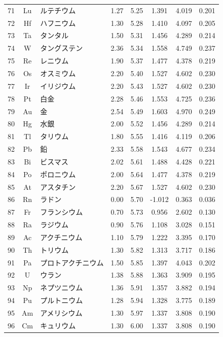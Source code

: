 \documentclass[11pt,a4paper]{article}
\begin{document}
\begin{longtable}{|c|c|p{2.5cm}|c|c|c|c|c|}
			71 & Lu & ルテチウム & 1.27 & 5.25 & 1.391 & 4.019 & 0.201 \\
			72 & Hf & ハフニウム & 1.30 & 5.28 & 1.410 & 4.097 & 0.205 \\
			73 & Ta & タンタル & 1.50 & 5.31 & 1.456 & 4.289 & 0.214 \\
			74 & W & タングステン & 2.36 & 5.34 & 1.558 & 4.749 & 0.237 \\
			75 & Re & レニウム & 1.90 & 5.37 & 1.477 & 4.378 & 0.219 \\
			76 & Os & オスミウム & 2.20 & 5.40 & 1.527 & 4.602 & 0.230 \\
			77 & Ir & イリジウム & 2.20 & 5.43 & 1.527 & 4.602 & 0.230 \\
			78 & Pt & 白金 & 2.28 & 5.46 & 1.553 & 4.725 & 0.236 \\
			79 & Au & 金 & 2.54 & 5.49 & 1.603 & 4.970 & 0.249 \\
			80 & Hg & 水銀 & 2.00 & 5.52 & 1.456 & 4.289 & 0.214 \\
			81 & Tl & タリウム & 1.80 & 5.55 & 1.416 & 4.119 & 0.206 \\
			82 & Pb & 鉛 & 2.33 & 5.58 & 1.543 & 4.677 & 0.234 \\
			83 & Bi & ビスマス & 2.02 & 5.61 & 1.488 & 4.428 & 0.221 \\
			84 & Po & ポロニウム & 2.00 & 5.64 & 1.477 & 4.378 & 0.219 \\
			85 & At & アスタチン & 2.20 & 5.67 & 1.527 & 4.602 & 0.230 \\
			86 & Rn & ラドン & 0.00 & 5.70 & -1.012 & 0.363 & 0.036 \\
			87 & Fr & フランシウム & 0.70 & 5.73 & 0.956 & 2.602 & 0.130 \\
			88 & Ra & ラジウム & 0.90 & 5.76 & 1.108 & 3.028 & 0.151 \\
			89 & Ac & アクチニウム & 1.10 & 5.79 & 1.222 & 3.395 & 0.170 \\
			90 & Th & トリウム & 1.30 & 5.82 & 1.313 & 3.717 & 0.186 \\
			91 & Pa & プロトアクチニウム & 1.50 & 5.85 & 1.397 & 4.043 & 0.202 \\
			92 & U & ウラン & 1.38 & 5.88 & 1.363 & 3.909 & 0.195 \\
			93 & Np & ネプツニウム & 1.36 & 5.91 & 1.357 & 3.882 & 0.194 \\
			94 & Pu & プルトニウム & 1.28 & 5.94 & 1.328 & 3.775 & 0.189 \\
			95 & Am & アメリシウム & 1.30 & 5.97 & 1.337 & 3.808 & 0.190 \\
			96 & Cm & キュリウム & 1.30 & 6.00 & 1.337 & 3.808 & 0.190 \\

\end{longtable}
\end{document}
